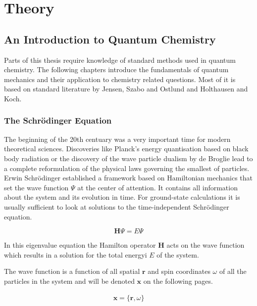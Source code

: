 
\chapter{Theory}
\label{sec:theory}


\section{An Introduction to Quantum Chemistry}
\label{sec:IntroductiontoQM}

Parts of this thesis require knowledge of standard methods used in quantum
chemistry. The following chapters introduce the fundamentals of quantum
mechanics and their application to chemistry related questions. Most of it is
based on standard literature by Jensen\autocite{jensen_introduction_2006},
Szabo and Ostlund\autocite{szabo_modern_1996} and Holthausen and
Koch\autocite{koch_chemists_2001}.

\subsection{The Schr\"odinger Equation}

The beginning of the 20th centuary was a very important time for modern
theoretical sciences. Discoveries like Planck's energy quantisation based on
black body radiation or the discovery of the wave particle dualism by de
Broglie lead to a complete reformulation of the physical laws governing the
smallest of particles. Erwin Schr\"odinger established a framework based on
Hamiltonian mechanics that set the wave function $\Psi$ at the center of
attention. It contains all information about the system and its evolution in
time. For ground-state calculations it is usually sufficient to look at
solutions to the time-independent Schr\"odinger equation.

\begin{equation}
	\mathbf{H}\Psi=E\Psi\label{eqn:SchrodingerEquation}
\end{equation}

In this eigenvalue equation the Hamilton operator $\mathbf{H}$ acts on the wave
function which results in a solution for the total energyi $E$ of the system. 

The wave function is a function of all spatial $\mathbf{r}$ and spin
coordinates $\omega$ of all the particles in the system and will be denoted
$\mathbf{x}$ on the following pages.  

\begin{align}
	\mathbf{x}=\{\mathbf{r},\omega\}
\end{align}

